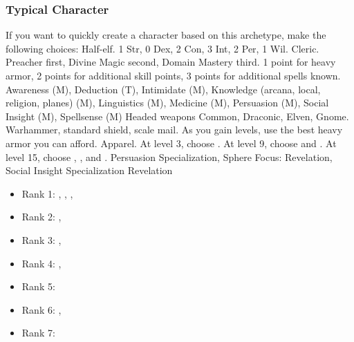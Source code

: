         \subsubsection{Typical Character}
            If you want to quickly create a character based on this archetype, make the following choices:
             Half-elf.
             1 Str, 0 Dex, 2 Con, 3 Int, 2 Per, 1 Wil.
             Cleric.
             Preacher first, Divine Magic second, Domain Mastery third.
             1 point for heavy armor, 2 points for additional skill points, 3 points for additional spells known.
             Awareness (M), Deduction (T), Intimidate (M), Knowledge (arcana, local, religion, planes) (M), Linguistics (M), Medicine (M), Persuasion (M), Social Insight (M), Spellsense (M)
             Headed weapons
             Common, Draconic, Elven, Gnome.
             Warhammer, standard shield, scale mail. As you gain levels, use the best heavy armor you can afford.
             Apparel.
                At level 3, choose .
                At level 9, choose  and .
                At level 15, choose , , and .
             Persuasion Specialization, Sphere Focus: Revelation, Social Insight Specialization
             Revelation
            \begin{itemize}
                \item Rank 1: , , , 
                \item Rank 2: , 
                \item Rank 3: , 
                \item Rank 4: , 
                \item Rank 5: 
                \item Rank 6: , 
                \item Rank 7: 
            \end{itemize}
